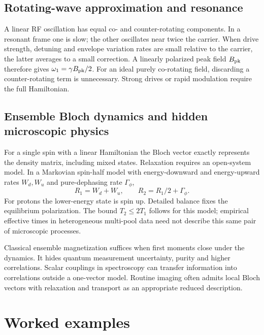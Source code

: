 \subsection{Rotating-wave approximation and resonance}
A linear RF oscillation has equal co- and counter-rotating components.
In a resonant frame one is slow; the other oscillates near twice the carrier.
When drive strength, detuning and envelope variation rates are small
relative to the carrier, the latter averages to a small correction.
A linearly polarized peak field $B_{\rm pk}$ therefore gives
$\omega_1=\gamma B_{\rm pk}/2$. For an ideal purely co-rotating field,
discarding a counter-rotating term is unnecessary. Strong drives or
rapid modulation require the full Hamiltonian.

\subsection{Ensemble Bloch dynamics and hidden microscopic physics}
For a single spin with a linear Hamiltonian the Bloch vector exactly
represents the density matrix, including mixed states.
Relaxation requires an open-system model. In a Markovian spin-half
model with energy-downward and energy-upward rates $W_d,W_u$ and
pure-dephasing rate $\Gamma_\phi$,
\[
 R_1=W_d+W_u,\qquad R_2=R_1/2+\Gamma_\phi .
\]
For protons the lower-energy state is spin up. Detailed balance fixes
the equilibrium polarization. The bound $T_2\leq2T_1$ follows for this
model; empirical effective times in heterogeneous multi-pool data need
not describe this same pair of microscopic processes.

Classical ensemble magnetization suffices when first moments close under
the dynamics. It hides quantum measurement uncertainty, purity and
higher correlations. Scalar couplings in spectroscopy can transfer
information into correlations outside a one-vector model. Routine imaging
often admits local Bloch vectors with relaxation and transport as an
appropriate reduced description.

\section{Worked examples}
\label{sec:02:worked-examples}
